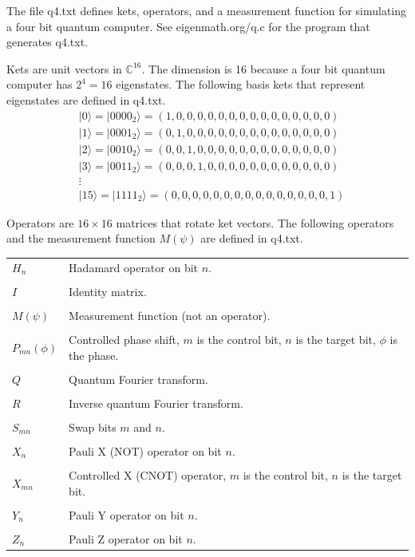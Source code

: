 \documentclass[12pt]{article}
\begin{document}
\noindent
The file q4.txt defines kets, operators, and a measurement function
for simulating a four bit quantum computer.
See eigenmath.org/q.c for the program that generates q4.txt.

\bigskip
\noindent
Kets are unit vectors in $\mathbb{C}^{16}$.
The dimension is 16 because a four bit quantum computer has $2^4=16$ eigenstates.
The following basis kets that represent eigenstates are defined in q4.txt.
\begin{align*}
&|0\rangle=|0000_2\rangle=(1,0,0,0,0,0,0,0,0,0,0,0,0,0,0,0)
\\
&|1\rangle=|0001_2\rangle=(0,1,0,0,0,0,0,0,0,0,0,0,0,0,0,0)
\\
&|2\rangle=|0010_2\rangle=(0,0,1,0,0,0,0,0,0,0,0,0,0,0,0,0)
\\
&|3\rangle=|0011_2\rangle=(0,0,0,1,0,0,0,0,0,0,0,0,0,0,0,0)
\\
&\vdots
\\
&|15\rangle=|1111_2\rangle=(0,0,0,0,0,0,0,0,0,0,0,0,0,0,0,1)
\end{align*}

\noindent
Operators are $16\times16$ matrices that rotate ket vectors.
The following operators and the measurement function $M(\psi)$ are defined in q4.txt.

\bigskip
\begin{tabular}{l l}
$H_n$ & Hadamard operator on bit $n$.
\\
\\
$I$ & Identity matrix.
\\
\\
$M(\psi)$ & Measurement function (not an operator).
\\
\\
$P_{mn}(\phi)$ & Controlled phase shift, $m$ is the control bit, $n$ is the target bit, $\phi$ is the phase.
\\
\\
$Q$ & Quantum Fourier transform.
\\
\\
$R$ & Inverse quantum Fourier transform.
\\
\\
$S_{mn}$ & Swap bits $m$ and $n$.
\\
\\
$X_n$ & Pauli X (NOT) operator on bit $n$.
\\
\\
$X_{mn}$ & Controlled X (CNOT) operator, $m$ is the control bit, $n$ is the target bit.
\\
\\
$Y_n$ & Pauli Y operator on bit $n$.
\\
\\
$Z_n$ & Pauli Z operator on bit $n$.
\end{tabular}
\end{document}
